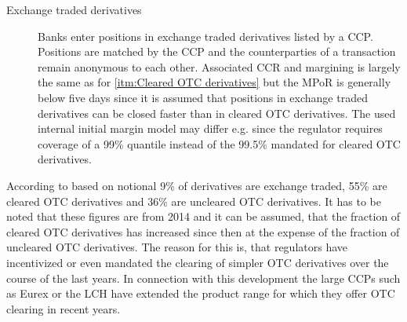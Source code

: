 \documentclass[../Thesis_AHoecherl.tex]{subfiles}
\begin{document}
\begin{description}
    \item[Exchange traded derivatives\label{itm:Exchange traded derivatives}] 
    Banks enter positions in exchange traded derivatives listed by a CCP. Positions are matched by the CCP and the counterparties of a transaction remain anonymous to each other. Associated \gls{CCR} and margining is largely the same as for \ref{itm:Cleared OTC derivatives} but the \gls{MPoR} is generally below five days since it is assumed that positions in exchange traded derivatives can be closed faster than in cleared \gls{OTC} derivatives. The used internal initial margin model may differ e.g. since the regulator requires coverage of a 99\% quantile instead of the 99.5\% mandated for cleared \gls{OTC} derivatives.
\end{description}

According to \cite[Figure~3.2]{gregory2015xva} based on notional 9\% of derivatives are exchange traded, 55\% are cleared OTC derivatives and 36\% are uncleared OTC derivatives. It has to be noted that these figures are from 2014 and it can be assumed, that the fraction of cleared OTC derivatives has increased since then at the expense of the fraction of uncleared OTC derivatives. The reason for this is, that regulators have incentivized or even mandated the clearing of simpler OTC derivatives over the course of the last years. In connection with this development the large CCPs such as Eurex or the LCH have extended the product range for which they offer OTC clearing in recent years.

%     
\end{document}
